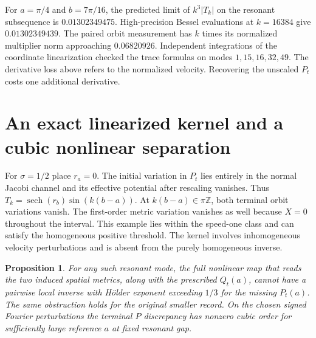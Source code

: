 \documentclass[11pt]{article}
\newtheorem{proposition}{Proposition}
\newcommand{\sech}{\operatorname{sech}}
\begin{document}
For $a=\pi/4$ and $b=7\pi/16$, the predicted limit of
$k^3|T_k|$ on the resonant subsequence is $0.01302349475$.
High-precision Bessel evaluations at $k=16384$ give $0.01302349439$.
The paired orbit measurement has $k$ times its normalized
multiplier norm approaching $0.06820926$.
Independent integrations of the coordinate linearization checked
the trace formulas on modes $1,15,16,32,49$.
The derivative loss above refers to the normalized velocity.
Recovering the unscaled $P_t$ costs one additional derivative.



\section{An exact linearized kernel and a cubic nonlinear separation}
For $\sigma=1/2$ place $r_a=0$. The initial variation in $P_t$ lies
entirely in the normal Jacobi channel and its effective potential
after rescaling vanishes. Thus
$T_k=\sech(r_b)\sin(k(b-a))$.
At $k(b-a)\in\pi\mathbb{Z}$, both terminal orbit variations vanish.
The first-order metric variation vanishes as well because
$X=0$ throughout the interval. This example lies within the
speed-one class and can satisfy the homogeneous positive
threshold. The kernel involves inhomogeneous velocity
perturbations and is absent from the purely homogeneous inverse.

\begin{proposition}
For any such resonant mode, the full nonlinear map that reads
the two induced spatial metrics, along with the prescribed
$Q_t(a)$, cannot have a pairwise local inverse with H\"older
exponent exceeding $1/3$ for the missing $P_t(a)$.
The same obstruction holds for the original smaller record.
On the chosen signed Fourier perturbations the terminal $P$
discrepancy has nonzero cubic order for sufficiently large
reference $a$ at fixed resonant gap.
\end{proposition}
\end{document}
